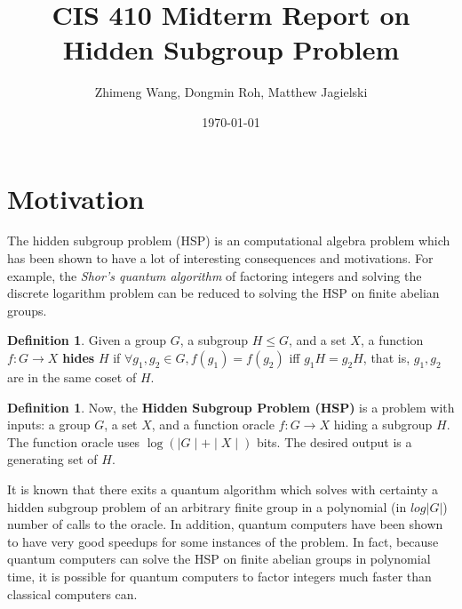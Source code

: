 \documentclass[12pt]{article}
\theoremstyle{plain}
\theoremstyle{definition}
\newtheorem{defn}[thm]{Definition} %
\begin{document}

\title{CIS 410 Midterm Report on Hidden Subgroup Problem}
\author{Zhimeng Wang, Dongmin Roh, Matthew Jagielski}
\date{\today}



\maketitle


\section{Motivation}

The hidden subgroup problem (HSP) is an computational algebra problem which has been shown to have a lot of interesting consequences and motivations. For example, the \emph{Shor's quantum algorithm} of factoring integers and solving the discrete logarithm problem can be reduced to solving the HSP on finite abelian groups.

\begin{defn}
Given a group $G$, a subgroup $H\le G$, and a set $X$, a function $f:G\rightarrow X$ \textbf{hides} $H$ if $\forall g_1,g_2\in G, f(g_1)=f(g_2)$ iff $g_1H=g_2H$, that is, $g_1,g_2$ are in the same coset of $H$.
\end{defn}

\begin{defn}
Now, the \textbf{Hidden Subgroup Problem (HSP)} is a problem with inputs: a group $G$, a set $X$, and a function oracle $f: G\rightarrow X$ hiding a subgroup $H$. The function oracle uses $\log(\mid G\mid + \mid X\mid)$ bits. The desired output is a generating set of $H$.
\end{defn}

It is known that there exits a quantum algorithm which solves with certainty a hidden subgroup problem of an arbitrary finite group in a polynomial (in $log|G|$) number of calls to the oracle. In addition, quantum computers have been shown to have very good speedups for some instances of the problem. In fact, because quantum computers can solve the HSP on finite abelian groups in polynomial time, it is possible for quantum computers to factor integers much faster than classical computers can.\\
\end{document}
